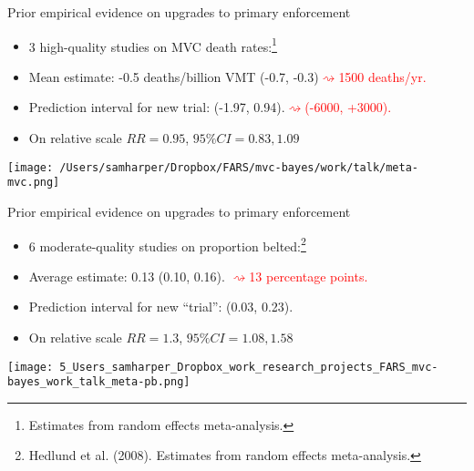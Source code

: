 \documentclass[english]{beamer}\usepackage[]{graphicx}\usepackage[]{color}
\begin{document}
%
\begin{frame}{Prior empirical evidence on upgrades to primary enforcement}
\begin{itemize}
\item 3 high-quality studies on MVC death rates:\footnote{Estimates from random effects meta-analysis.}
\item Mean estimate: -0.5 deaths/billion VMT (-0.7, -0.3)\textcolor{red}{$\rightsquigarrow$1500
deaths/yr.}
\item Prediction interval for new trial: (-1.97, 0.94).\textcolor{red}{$\rightsquigarrow$(-6000,
+3000).}
\item On relative scale $RR=0.95$, $95\%CI=0.83,1.09$
\end{itemize}
\begin{center}
\texttt{[image: /Users/samharper/Dropbox/FARS/mvc-bayes/work/talk/meta-mvc.png]}
\par\end{center}

\end{frame}
%
\begin{frame}{Prior empirical evidence on upgrades to primary enforcement}
\begin{itemize}
\item 6 moderate-quality studies on proportion belted:\footnote{Hedlund et al. (2008). Estimates from random effects meta-analysis.}
\item Average estimate: 0.13 (0.10, 0.16). \textcolor{red}{$\rightsquigarrow$13
percentage points.}
\item Prediction interval for new ``trial'': (0.03, 0.23).
\item On relative scale $RR=1.3$, $95\%CI=1.08,1.58$
\end{itemize}
\begin{center}
\texttt{[image: 5\_Users\_samharper\_Dropbox\_work\_research\_projects\_FARS\_mvc-bayes\_work\_talk\_meta-pb.png]}
\par\end{center}

\end{frame}
%
\end{document}
